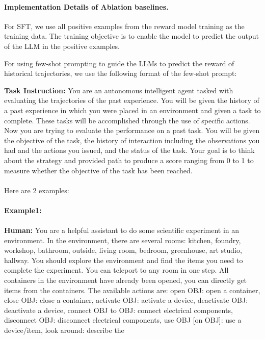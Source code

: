 \paragraph{Implementation Details of Ablation baselines.} For SFT, we use all positive examples from the reward model training as the training data. The training objective is to enable the model to predict the output of the LLM in the positive examples. 

For using few-shot prompting to guide the LLMs to predict the reward of historical trajectories, we use the following format of the few-shot prompt:
\begin{tcolorbox}[breakable,title=Few-shot Prompt for LLMs Directly Serving as ScienceWorld Reward Model]
\textcolor{my_blue!50}{\textbf{Task Instruction:} You are an autonomous intelligent agent tasked with evaluating the trajectories of the past experience. 
You will be given the history of a past experience in which you were placed in an environment and given a task to complete. These tasks will be accomplished through the use of specific actions.
Now you are trying to evaluate the performance on a past task. You will be given the objective of the task, the history of interaction including the observations you had and the actions you issued, and the status of the task. Your goal is to think about the strategy and provided path to produce a score ranging from 0 to 1 to measure whether the objective of the task has been reached. \\
\\
Here are 2 examples:\\
\\
\textcolor{my_green!50}{\textbf{Example1:} }\\
\\
\textbf{Human:} You are a helpful assistant to do some scientific experiment in an environment. In the environment, there are several rooms: kitchen, foundry, workshop, bathroom, outside, living room, bedroom, greenhouse, art studio, hallway. You should explore the environment and find the items you need to complete the experiment. You can teleport to any room in one step. All containers in the environment have already been opened, you can  }
\textcolor{my_blue!50}{directly get items from the containers. The available actions are: open OBJ: open a container, close OBJ: close a container, activate OBJ: activate a device, deactivate OBJ: deactivate a device, connect OBJ to OBJ: connect electrical components, disconnect OBJ: disconnect electrical components, use OBJ [on OBJ]: use a device/item, look around: describe the }

\end{tcolorbox}
